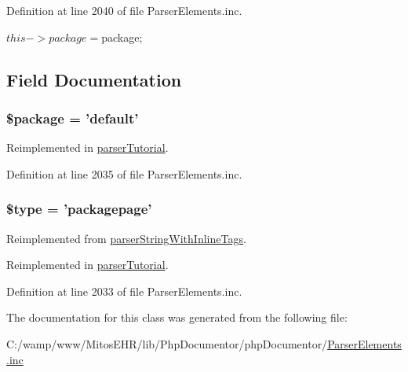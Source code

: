 \-Definition at line 2040 of file \-Parser\-Elements.\-inc.


\begin{DoxyCode}
    {
        $this->package = $package;
    }
\end{DoxyCode}


\subsection{\-Field \-Documentation}
\hypertarget{classparser_package_page_a365395516cc195292e97e09bc0d165ae}{
\subsubsection[{\$package}]{\setlength{\rightskip}{0pt plus 5cm}\$package = 'default'}}\label{classparser_package_page_a365395516cc195292e97e09bc0d165ae}


\-Reimplemented in \hyperlink{classparser_tutorial_a365395516cc195292e97e09bc0d165ae}{parser\-Tutorial}.



\-Definition at line 2035 of file \-Parser\-Elements.\-inc.

\hypertarget{classparser_package_page_a9a4a6fba2208984cabb3afacadf33919}{
\subsubsection[{\$type}]{\setlength{\rightskip}{0pt plus 5cm}\$type = 'packagepage'}}\label{classparser_package_page_a9a4a6fba2208984cabb3afacadf33919}


\-Reimplemented from \hyperlink{classparser_string_with_inline_tags_a9a4a6fba2208984cabb3afacadf33919}{parser\-String\-With\-Inline\-Tags}.



\-Reimplemented in \hyperlink{classparser_tutorial_a9a4a6fba2208984cabb3afacadf33919}{parser\-Tutorial}.



\-Definition at line 2033 of file \-Parser\-Elements.\-inc.



\-The documentation for this class was generated from the following file\-:\begin{DoxyCompactItemize}
\item 
\-C\-:/wamp/www/\-Mitos\-E\-H\-R/lib/\-Php\-Documentor/php\-Documentor/\hyperlink{_parser_elements_8inc}{\-Parser\-Elements.\-inc}\end{DoxyCompactItemize}
